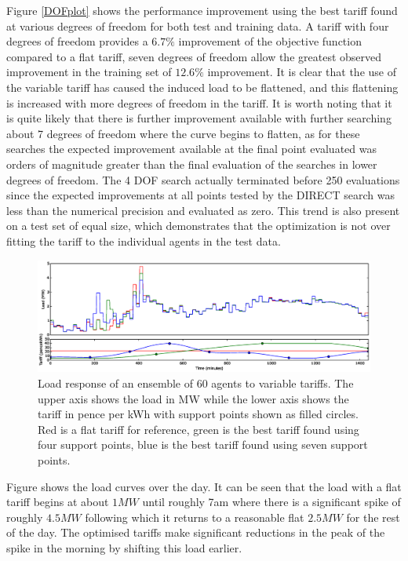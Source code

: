 \documentclass[a4paper, 10 pt, conference]{ieeeconf}  %
\begin{document}
Figure \ref{DOFplot} shows the performance improvement using the best tariff found at various degrees of freedom for both test and training data. A tariff with four degrees of freedom provides a $6.7\%$ improvement of the objective function compared to a flat tariff, seven degrees of freedom allow the greatest observed improvement in the training set of $12.6\%$ improvement. It is clear that the use of the variable tariff has caused the induced load to be flattened, and this flattening is increased with more degrees of freedom in the tariff. It is worth noting that it is quite likely that there is further improvement available with further searching about 7 degrees of freedom where the curve begins to flatten, as for these searches the expected improvement available at the final point evaluated was orders of magnitude greater than the final evaluation of the searches in lower degrees of freedom. The 4 DOF search actually terminated before 250 evaluations since the expected improvements at all points tested by the DIRECT search was less than the numerical precision and evaluated as zero. This trend is also present on a test set of equal size, which demonstrates that the optimization is not over fitting the tariff to the individual agents in the test data. 

\begin{figure}[htb]
\centering
\includegraphics[width=\textwidth,trim =4cm 12cm 4cm 2cm,clip=True]{f1.eps}
\caption{Load response of an ensemble of 60 agents to variable tariffs. The upper axis shows the load in MW while the lower axis shows the tariff in pence per kWh with support points shown as filled circles. Red is a flat tariff for reference, green is the best tariff found using four support points, blue is the best tariff found using seven support points.}
\label{loadcurve}
\end{figure}

Figure \cite{loadcurve} shows the load curves over the day. It can be seen that the load with a flat tariff begins at about $1MW$ until roughly 7am where there is a significant spike of roughly $4.5MW$ following which it returns to a reasonable flat $2.5MW$ for the rest of the day. The optimised tariffs make significant reductions in the peak of the spike in the morning  by shifting this load earlier.
\end{document}

